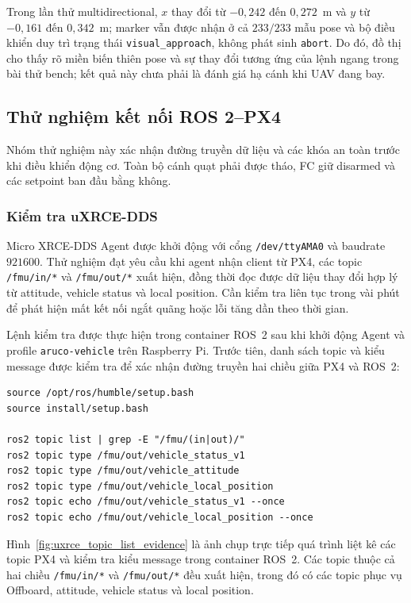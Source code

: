 Trong lần thử multidirectional, $x$ thay đổi từ $-0{,}242$ đến $0{,}272$~m và $y$ từ $-0{,}161$ đến $0{,}342$~m; marker vẫn được nhận ở cả $233/233$ mẫu pose và bộ điều khiển duy trì trạng thái \texttt{visual\_approach}, không phát sinh \texttt{abort}. Do đó, đồ thị cho thấy rõ miền biến thiên pose và sự thay đổi tương ứng của lệnh ngang trong bài thử bench; kết quả này chưa phải là đánh giá hạ cánh khi UAV đang bay.

\subsection{Thử nghiệm kết nối ROS 2--PX4}

Nhóm thử nghiệm này xác nhận đường truyền dữ liệu và các khóa an toàn trước khi điều khiển động cơ. Toàn bộ cánh quạt phải được tháo, FC giữ disarmed và các setpoint ban đầu bằng không.

\subsubsection{Kiểm tra uXRCE-DDS}

Micro XRCE-DDS Agent được khởi động với cổng \texttt{/dev/ttyAMA0} và baudrate $921600$. Thử nghiệm đạt yêu cầu khi agent nhận client từ PX4, các topic \texttt{/fmu/in/*} và \texttt{/fmu/out/*} xuất hiện, đồng thời đọc được dữ liệu thay đổi hợp lý từ attitude, vehicle status và local position. Cần kiểm tra liên tục trong vài phút để phát hiện mất kết nối ngắt quãng hoặc lỗi tăng dần theo thời gian.

Lệnh kiểm tra được thực hiện trong container ROS~2 sau khi khởi động Agent và profile \texttt{aruco-vehicle} trên Raspberry Pi. Trước tiên, danh sách topic và kiểu message được kiểm tra để xác nhận đường truyền hai chiều giữa PX4 và ROS~2:

\begin{lstlisting}[style=terminaloutput,caption={Lệnh kiểm tra topic và kiểu message của uXRCE-DDS},label={lst:uxrce_topic_check}]
source /opt/ros/humble/setup.bash
source install/setup.bash

ros2 topic list | grep -E "/fmu/(in|out)/"
ros2 topic type /fmu/out/vehicle_status_v1
ros2 topic type /fmu/out/vehicle_attitude
ros2 topic type /fmu/out/vehicle_local_position
ros2 topic echo /fmu/out/vehicle_status_v1 --once
ros2 topic echo /fmu/out/vehicle_local_position --once
\end{lstlisting}

Hình~\ref{fig:uxrce_topic_list_evidence} là ảnh chụp trực tiếp quá trình liệt kê các topic PX4 và kiểm tra kiểu message trong container ROS~2. Các topic thuộc cả hai chiều \texttt{/fmu/in/*} và \texttt{/fmu/out/*} đều xuất hiện, trong đó có các topic phục vụ Offboard, attitude, vehicle status và local position.


